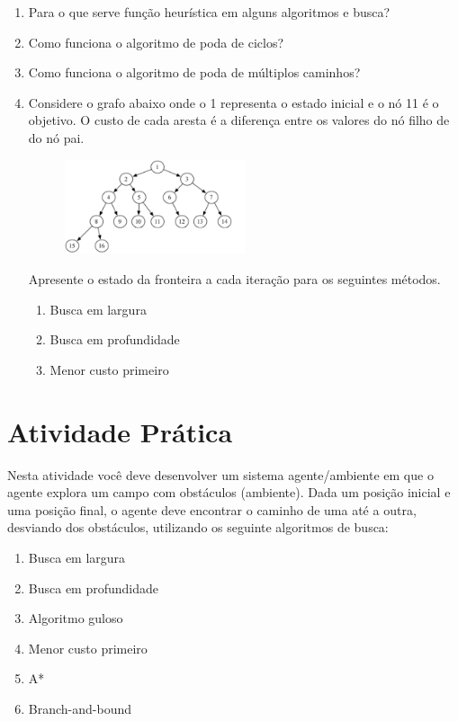 \documentclass{article}
\begin{document}
\begin{enumerate}
    \item Para o que serve função heurística em alguns algoritmos e busca? 
    
    \item Como funciona o algoritmo de poda de ciclos?
    
    \item Como funciona o algoritmo de poda de múltiplos caminhos?
    
    \item Considere o grafo abaixo onde o 1 representa o estado inicial e o nó 11 é o objetivo. O custo de cada aresta é a diferença entre os valores do nó filho de do nó pai.
    
    \begin{figure}[!ht]
        \centering
        \includegraphics[width=0.5\textwidth]{graph.PNG} \label{fig:my_label}
    \end{figure}
    
    Apresente o estado da fronteira a cada iteração para os seguintes métodos.
    
    \begin{enumerate}
        \item Busca em largura 
        \item Busca em profundidade
        \item Menor custo primeiro
    \end{enumerate}
    
\end{enumerate}

\section{Atividade Prática}

Nesta atividade você deve desenvolver um sistema agente/ambiente em que o agente explora um campo com obstáculos (ambiente). Dada um posição inicial e uma posição final, o agente deve encontrar o caminho de uma até a outra, desviando dos obstáculos, utilizando os seguinte algoritmos de busca:

\begin{enumerate}
    \item Busca em largura
    \item Busca em profundidade
    \item Algoritmo guloso
    \item Menor custo primeiro
    \item A*
    \item Branch-and-bound
\end{enumerate}
\end{document}
